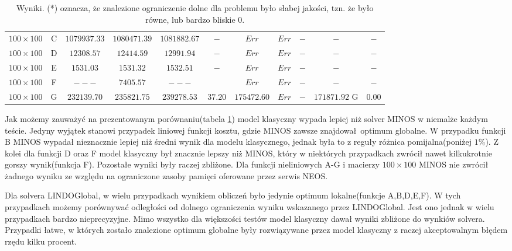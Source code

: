 \begin{table}[h!]
\begin{center}
{\begin{tabular}{c|c|c|c|c|c|c|c|c|c|c}
            $100 \times 100$ & C           & $1079937.33$ & $1080471.39$ & $1081882.67$ & $-$   & $Err$         & $Err$ & $-$                     & $-$ & $-$ \\
            $100 \times 100$ & D           & $12308.57$ & $12414.59$ & $12991.94$ & $-$         & $Err$         & $Err$ & $-$                     & $-$ & $-$ \\
            $100 \times 100$ & E           & $1531.03$ & $1531.32$ & $1532.51$ & $-$            & $Err$         & $Err$ & $-$                     & $-$ & $-$ \\
            $100 \times 100$ & F           & $---$ & $7405.57$ & $---$ &                        & $Err$         & $Err$ & $-$                     & $-$ & $-$ \\
            $100 \times 100$ & G           & $232139.70$ & $235821.75$ & $239278.53$ & $37.20$  & $175472.60$   & $Err$ & $-$                     & $171871.92$ G & $0.00$ \\
        \end{tabular}
        }
    \end{center}
    \caption{Wyniki. (*) oznacza, że znalezione ograniczenie dolne dla problemu było słabej jakości, tzn. że było równe, lub bardzo bliskie $0$.}
    \label{wyniki-1}
\end{table}


Jak możemy zauważyć na prezentowanym porównaniu(tabela \ref{wyniki-1}) model klasyczny wypada lepiej niż solver MINOS w niemalże każdym teście. Jedyny 
wyjątek stanowi przypadek liniowej funkcji kosztu, gdzie MINOS zawsze znajdował optimum globalne. W przypadku funkcji B MINOS wypadał nieznacznie 
lepiej niż średni wynik dla modelu klasycznego, jednak była to z reguły różnica pomijalna(poniżej $1\%$). Z kolei dla funkcji D oraz F model 
klasyczny był znacznie lepszy niż MINOS, który w niektórych przypadkach zwrócił nawet kilkukrotnie gorszy wynik(funkcja F). Pozostałe wyniki były raczej 
zbliżone. Dla funkcji nieliniowych A-G i macierzy $100 \times 100$ MINOS nie zwrócił żadnego wyniku ze względu na ograniczone zasoby pamięci oferowane 
przez serwis NEOS. 

Dla solvera LINDOGlobal, w wielu przypadkach wynikiem obliczeń było jedynie optimum lokalne(funkcje A,B,D,E,F). W tych przypadkach możemy 
porównywać odległości od dolnego ograniczenia wyniku wskazanego przez LINDOGlobal. Jest ono jednak w wielu przypadkach bardzo nieprecyzyjne. 
Mimo wszystko dla większości testów model klasyczny dawał wyniki zbliżone do wynkiów solvera. Przypadki łatwe, w których zostało znalezione optimum 
globalne były rozwiązywane przez model klasyczny z raczej akceptowalnym błędem rzędu kilku procent.


